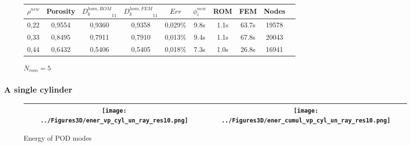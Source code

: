 \begin{figure}[H]%
%
\begin{center}
\begin{tabular}{|c|c||c|c||c|c||c|c||c||c|}
\hline
$\rho^{new}$&Porosity&${D_k^{hom,ROM}}_{11}$&${D_k^{hom,FEM}}_{11}$&$Err$&$\phi_i^{new}$&ROM&FEM&Nodes\\
\hline
0,22&0,9554&0,9360&0,9358&0,029\%&9.8s&1.1s&63.7s&19578\\
\hline
0,33&0,8495&0,7911&0,7910&0,013\%&9.4s&1.1s&67.8s&20043\\
\hline
0,44&0,6432&0,5406&0,5405&0,018\%&7.3s&1.0s&26.8s&16941\\
\hline
\end{tabular}
\end{center}
\caption{$N_{rom}=5$}
%
\end{figure}
\begin{comment}
\etoile

\begin{figure}[H]%
%
\begin{center}
\begin{tabular}{|c|c||c|c||c|c||c|c||c||c|}
\hline
$\rho^{new}$&Porosity&${D_k^{hom,ROM}}_{11}$&${D_k^{hom,FEM}}_{11}$&$Err$&$\phi_i^{new}$&ROM&FEM&Nodes\\
\hline
0,22&0,9553&\textbf{0.9363}&0,9356&\textbf{0.086}\%&\textbf{5}s&$<$1s&75s&20724\\
\hline
0,33&0,8494&\textbf{0.7992}&0,7910&\textbf{0.013}\%&\textbf{4}s&$<$1s&60s&20544\\
\hline
0,44&0,6431&\textbf{0.5408}&0,5405&\textbf{0.048}\%&\textbf{4}s&$<$1s&30s&16953\\
\hline
\end{tabular}
\end{center}
\caption{$\mathbf{N_{rom}=3}$}
%
\end{figure}
\end{comment}
\subsubsection{A single cylinder}

\begin{figure}[H]
\begin{center}
\begin{tabular}{|c|c|}
\hline
\texttt{[image: ../Figures3D/ener\_vp\_cyl\_un\_ray\_res10.png]}
&%
\texttt{[image: ../Figures3D/ener\_cumul\_vp\_cyl\_un\_ray\_res10.png]}
\\ \hline
\end{tabular}
\end{center}
\caption{Energy of POD modes}
\end{figure}

